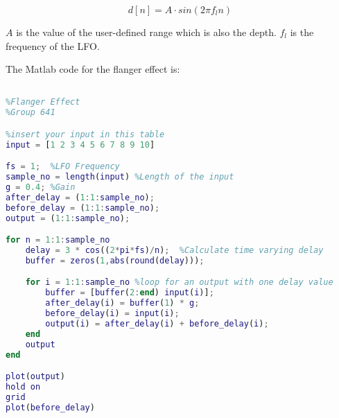 \begin{equation}
	d[n]= A \cdot sin(2\pi f_{l} n)
\end{equation}

$A$ is the value of the user-defined range which is also the depth. $f_{l}$ is the frequency of the LFO. 

The Matlab code for the flanger effect is:

\begin{lstlisting}[language=Matlab, caption= Matlab code for flanger effect]

%Flanger Effect
%Group 641

%insert your input in this table
input = [1 2 3 4 5 6 7 8 9 10]

fs = 1;  %LFO Frequency
sample_no = length(input) %Length of the input
g = 0.4; %Gain
after_delay = (1:1:sample_no); 
before_delay = (1:1:sample_no);
output = (1:1:sample_no);

for n = 1:1:sample_no
	delay = 3 * cos((2*pi*fs)/n);  %Calculate time varying delay
	buffer = zeros(1,abs(round(delay)));

	for i = 1:1:sample_no %loop for an output with one delay value
		buffer = [buffer(2:end) input(i)];
		after_delay(i) = buffer(1) * g;
		before_delay(i) = input(i); 
		output(i) = after_delay(i) + before_delay(i);
	end
	output
end

plot(output)
hold on
grid
plot(before_delay)

\end{lstlisting}





